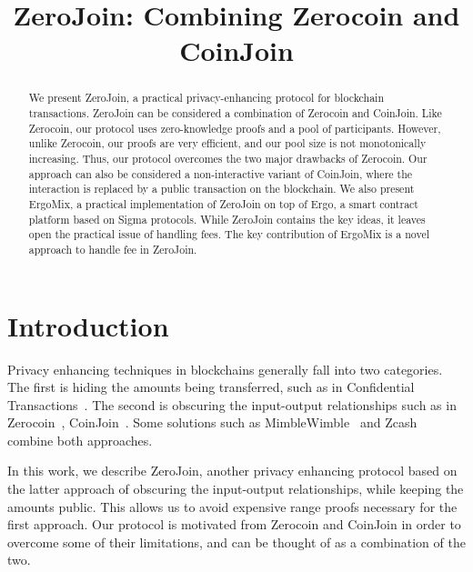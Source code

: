 \documentclass[runningheads]{llncs}
\newcommand{\mixname}{ErgoMix\xspace}
\begin{document}
\newcommand{\algname}{ZeroJoin\xspace}
\title{\algname: Combining Zerocoin and CoinJoin}

\maketitle

\begin{abstract}

We present \algname, a practical privacy-enhancing protocol for blockchain transactions. \algname can be considered a combination of Zerocoin and CoinJoin. 
Like Zerocoin, our protocol uses zero-knowledge proofs and a pool of
participants. However, unlike Zerocoin, our proofs are very efficient, and our pool size is not monotonically increasing.
Thus, our protocol overcomes the two major drawbacks of Zerocoin. Our approach can also be considered a non-interactive variant of CoinJoin, where the interaction is replaced by a public transaction on the blockchain. We also present \mixname, a practical implementation of \algname on top of Ergo, a smart contract platform based on Sigma protocols. While \algname contains the key ideas, it leaves open the practical issue of handling fees. The key contribution of \mixname is a novel approach to handle fee in \algname. 

\end{abstract}

\section{Introduction}
\label{intro}

Privacy enhancing techniques in blockchains generally fall into two categories. The first is hiding the amounts being transferred, such as in Confidential Transactions~\cite{ct}. The second is obscuring the input-output relationships such as in Zerocoin~\cite{zerocoin}, CoinJoin~\cite{coinjoin}. Some solutions such as MimbleWimble~\cite{mw} and Zcash~\cite{zcash,zcash1} combine both approaches.

In this work, we describe \algname, another privacy enhancing protocol based on the latter approach of obscuring the input-output relationships, while keeping the amounts public. This allows us to avoid expensive range proofs necessary for the first approach. Our protocol is motivated from Zerocoin and CoinJoin in order to overcome some of their limitations, and can be thought of as a combination of the two.
\end{document}
